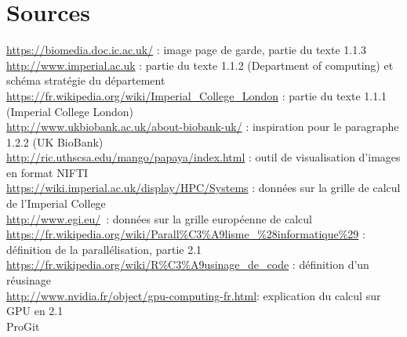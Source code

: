 \documentclass[10pt]{report}
\begin{document}
\chapter*{Sources}
\noindent
\url{https://biomedia.doc.ic.ac.uk/}  : image page de garde, partie du texte 1.1.3 \\
\url{http://www.imperial.ac.uk} : partie du texte 1.1.2 (Department of computing) et schéma stratégie du département\\
\url{https://fr.wikipedia.org/wiki/Imperial_College_London} : partie du texte 1.1.1 (Imperial College London)\\
\url{http://www.ukbiobank.ac.uk/about-biobank-uk/} : inspiration pour le paragraphe 1.2.2 (UK BioBank)\\
\url{http://ric.uthscsa.edu/mango/papaya/index.html} : outil de visualisation d'images en format NIFTI\\
\url{https://wiki.imperial.ac.uk/display/HPC/Systems} : données sur la grille de calcul de l'Imperial College\\
\url{http://www.egi.eu/} : données sur la grille européenne de calcul
\url{https://fr.wikipedia.org/wiki/Parall\%C3\%A9lisme_\%28informatique\%29} : définition de la parallélisation, partie 2.1\\
\url{https://fr.wikipedia.org/wiki/R\%C3\%A9usinage_de_code} :  définition d'un réusinage \\
\url{http://www.nvidia.fr/object/gpu-computing-fr.html}: explication du calcul sur GPU en 2.1\\
ProGit\\


\renewcommand{\listfigurename}{Table des illustations}\listoffigures 
{}
\end{document}
